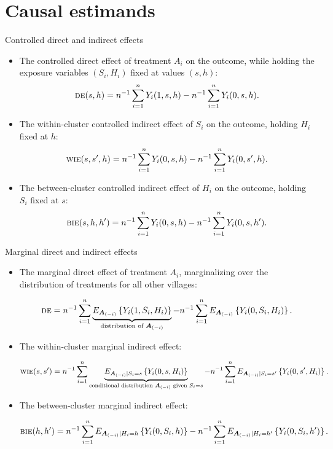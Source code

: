 \documentclass[aspectratio=169]{beamer}
\newcommand{\bA}{\boldsymbol{A}}
\newcommand{\sumi}{\sum_{i=1}^n}
\newcommand{\de}{\textsc{de}}
\newcommand{\bie}{\textsc{bie}}
\newcommand{\wie}{\textsc{wie}}
\begin{document}
\section{Causal estimands}

\begin{frame}{Controlled direct and indirect effects}
\begin{itemize}
    \item The controlled direct effect of treatment $A_{i}$ on the outcome, while holding the exposure variables $(S_{i},H_{i})$ fixed at values $(s,h)$:
    {\small 
    \[
    \de(s,h) = n^{-1}\sumi Y_{i}(1,s,h) - n^{-1}\sumi Y_{i}(0,s,h).
    \]
    }
    \pause
    \item The within-cluster controlled indirect effect of $S_{i}$ on the outcome, holding $H_{i}$ fixed at $h$:
    {\small 
    \[
    \wie(s,s^{\prime},h) = n^{-1}\sumi Y_{i}(0,s,h) - n^{-1}\sumi Y_{i}(0,s^{\prime},h).
    \]
    }
    \pause
    \item The between-cluster controlled indirect effect of $H_{i}$ on the outcome, holding $S_{i}$ fixed at $s$:
    {\small
    \[
    \bie(s,h,h^{\prime}) = n^{-1}\sumi Y_{i}(0,s,h) - n^{-1}\sumi Y_{i}(0,s,h^{\prime}).
    \]
    }
\end{itemize}
\end{frame}

\begin{frame}{Marginal direct and indirect effects}
\begin{itemize}
    \item The marginal direct effect of treatment $A_{i}$, marginalizing over the distribution of treatments for all other villages:
    \begin{small}
    \[
    \de = n^{-1}\sumi \underbrace{E_{\bA_{(-i)}}\left\{Y_{i}(1,S_{i},H_{i})\right\}}_{\textup{distribution of }\bA_{(-i)}} - n^{-1}\sumi E_{\bA_{(-i)}}\left\{Y_{i}(0,S_{i},H_{i})\right\}.
    \]
    \end{small}
    \pause
    \item The within-cluster marginal indirect effect:
    \begin{small}
    \[
    \wie(s,s^{\prime}) = n^{-1}\sumi \underbrace{E_{\bA_{(-i)}\mid S_{i} = s}\left\{Y_{i}(0,s,H_{i})\right\}}_{\textup{conditional distribution }\bA_{(-i)}\textup{ given }S_{i}=s} - n^{-1}\sumi E_{\bA_{(-i)}\mid S_{i} = s^{\prime}}\left\{Y_{i}(0,s^{\prime},H_{i})\right\}.
    \]
    \end{small}
    \pause
    \item The between-cluster marginal indirect effect:
    \begin{small}
    \[
    \bie(h,h^{\prime}) = n^{-1}\sumi E_{\bA_{(-i)}\mid H_{i} = h}\left\{Y_{i}(0,S_{i},h)\right\} - n^{-1}\sumi E_{\bA_{(-i)}\mid H_{i} = h^{\prime}}\left\{Y_{i}(0,S_{i},h^{\prime})\right\}.
    \] 
    \end{small}
\end{itemize}
\end{frame}
\end{document}
